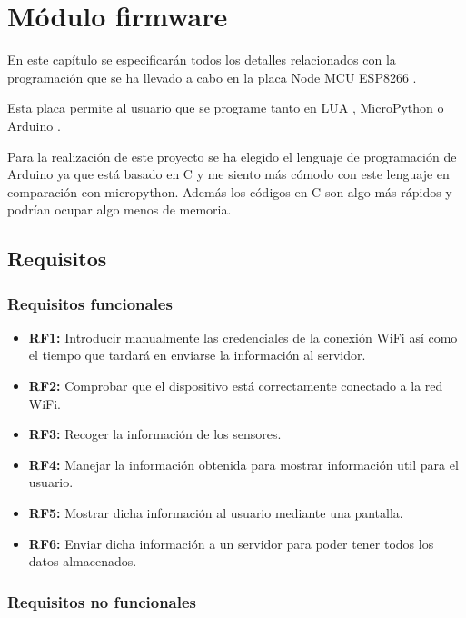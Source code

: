 \chapter{Módulo firmware}

En este capítulo se especificarán todos los detalles relacionados con la programación que se ha llevado a cabo en la placa Node MCU ESP8266 \cite{nodemcuwikipedia}.

Esta placa permite al usuario que se programe tanto en LUA \cite{luawikipedia}, MicroPython \cite{micropython} o Arduino \cite{arduino}.

Para la realización de este proyecto se ha elegido el lenguaje de programación de Arduino ya que está basado en C y me siento más cómodo con este lenguaje en comparación con micropython. Además los códigos en C son algo más rápidos y podrían ocupar algo menos de memoria.

\section{Requisitos}

\subsection{Requisitos funcionales}

\begin{itemize}
	\item\textbf{RF1: } Introducir manualmente las credenciales de la conexión WiFi así como el tiempo que tardará en enviarse la información al servidor.
	\item\textbf{RF2: } Comprobar que el dispositivo está correctamente conectado a la red WiFi.
	\item\textbf{RF3: } Recoger la información de los sensores.
	\item\textbf{RF4: } Manejar la información obtenida para mostrar información util para el usuario.
	\item\textbf{RF5: } Mostrar dicha información al usuario mediante una pantalla.
	\item\textbf{RF6: } Enviar dicha información a un servidor para poder tener todos los datos almacenados.
\end{itemize}

\subsection{Requisitos no funcionales}

